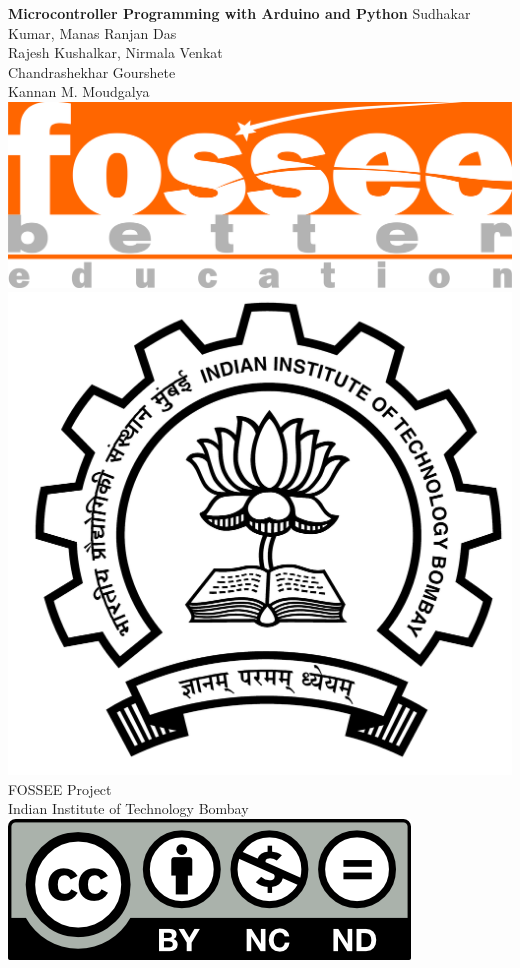 \begin{center}
    {\bf {\Huge Microcontroller Programming with Arduino and Python}}
    \vfill
    Sudhakar Kumar, Manas Ranjan Das \\
    Rajesh Kushalkar, Nirmala Venkat \\ 
    Chandrashekhar Gourshete \\ 
    Kannan M. Moudgalya \\
    \vfill
    \includegraphics[width=0.3\linewidth]{suppl/fossee_logo_hi.png} \quad
    \includegraphics[width=0.2\linewidth]{suppl/IITB-logo-HighRes.png} \\
    FOSSEE Project \\
    Indian Institute of Technology Bombay \\ [2mm]
    \includegraphics[width=0.15\linewidth]{suppl/by-nc-nd.png}
\end{center}

\clearpage
